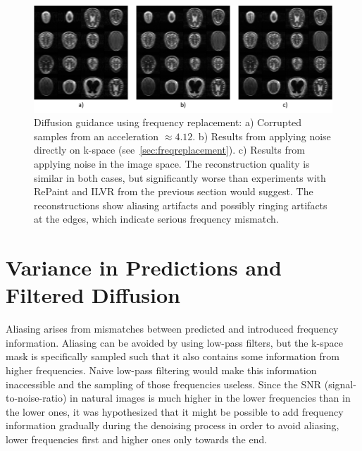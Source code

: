 \begin{figure}
    \centering
    \includegraphics[width=.6\textwidth]{images/freq_replacement.png}
    \caption[Frequency Replacement]{Diffusion guidance using frequency replacement: a) Corrupted samples from an acceleration $\approx 4.12$. b) Results from applying noise directly on k-space (see~\ref{sec:freqreplacement}). c) Results from applying noise in the image space. The reconstruction quality is similar in both cases, but significantly worse than experiments with RePaint and ILVR from the previous section would suggest. The reconstructions show aliasing artifacts and possibly ringing artifacts at the edges, which indicate serious frequency mismatch.}
    \label{fig:freqreplacement}
\end{figure}


\section{Variance in Predictions and Filtered Diffusion}
\label{sec:predvariance}
Aliasing arises from mismatches between predicted and introduced frequency information. Aliasing can be avoided by using low-pass filters, but the k-space mask is specifically sampled such that it also contains some information from higher frequencies. Naive low-pass filtering would make this information inaccessible and the sampling of those frequencies useless. Since the SNR (signal-to-noise-ratio) in natural images is much higher in the lower frequencies than in the lower ones, it was hypothesized that it might be possible to add frequency information gradually during the denoising process in order to avoid aliasing, lower frequencies first and higher ones only towards the end.

